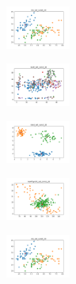 \vspace*{\fill}
\newpage
\vspace*{\fill}

\begin{figure}[H]    
    \centering
    \begin{subfigure}
        \centering
        \includegraphics[width=0.234\textwidth]{img/am01/iris_set_const_20_949004259_clust.png}
    \end{subfigure}
    \hfill
    \begin{subfigure}
        \centering
        \includegraphics[width=0.234\textwidth]{img/am01/ecoli_set_const_20_949004259_clust.png}
    \end{subfigure}
    \hfill
    \begin{subfigure}
        \centering
        \includegraphics[width=0.234\textwidth]{img/am01/rand_set_const_20_949004259_clust.png}
    \end{subfigure}
    \hfill
    \begin{subfigure}
        \centering
        \includegraphics[width=0.234\textwidth]{img/am01/newthyroid_set_const_20_949004259_clust.png}
    \end{subfigure}
    \hfill
    \begin{subfigure}
        \centering
        \includegraphics[width=0.234\textwidth]{img/am01/iris_set_const_20_589741062_clust.png}

\end{subfigure}
\end{figure}
